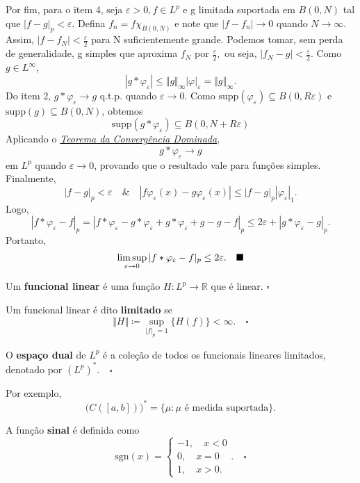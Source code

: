 \documentclass[MeasureTheory/measure_theory.tex]{subfiles}
\begin{document}
\begin{proof*}
	Por fim, para o item 4, seja \(\varepsilon > 0, f\in L^{p}\) e g limitada suportada em \(B(0, N)\) tal que \(|f-g|_{p}< \varepsilon .\) Defina \(f_{n} = f\chi_{B(0, N)}\) e note que \(|f-f_{n}|\to 0\) quando \(N\to \infty\). Assim,
	\(|f-f_{N}|<\frac{\varepsilon }{2}\) para N suficientemente grande. Podemos tomar, sem perda de generalidade, g simples que aproxima \(f_{N}\) por \(\frac{\varepsilon }{2},\) ou seja, \(|f_{N}-g|<\frac{\varepsilon }{2}\). Como \(g\in L^{\infty}\),
	\[
		|g*\varphi_{\varepsilon }|\leq \Vert g \Vert_{\infty}|\varphi |_{\varepsilon } = \Vert g \Vert_{\infty}.
	\]
	Do item 2, \(g*\varphi_{\varepsilon }\to g\) q.t.p. quando \(\varepsilon \to 0\). Como \(\mathrm{supp}(\varphi_{\varepsilon })\subseteq B(0, R\varepsilon )\) e \(\mathrm{supp}(g)\subseteq B(0, N)\), obtemos
	\[
		\mathrm{supp}(g*\varphi_{\varepsilon })\subseteq B(0, N + R\varepsilon )
	\]
	Aplicando o \hyperlink{dominated_convergence}{\textit{Teorema da Convergência Dominada}},
	\[
		g*\varphi_{\varepsilon }\to g
	\]
	em \(L^{p}\) quando \(\varepsilon \to 0\), provando que o resultado vale para funções simples. Finalmente,
	\[
		|f-g|_{p} <\varepsilon \quad\&\quad |f \varphi_{\varepsilon }(x) - g \varphi_{\varepsilon }(x)| \leq |f-g|_{p}|\varphi_{\varepsilon }|_{1}.
	\]
	Logo,
	\[
		|f*\varphi_{\varepsilon } - f|_{p} = |f*\varphi_{\varepsilon } - g*\varphi_{\varepsilon } + g*\varphi_{\varepsilon } + g - g - f|_{p}\leq 2\varepsilon + |g*\varphi_{\varepsilon }-g|_{p}.
	\]
	Portanto,
	\[
		\limsup_{\varepsilon \to 0}|f*\varphi_{\varepsilon }-f|_p \leq 2\varepsilon.\quad \text{$\blacksquare$}
	\]
\end{proof*}
\begin{def*}
	Um \textbf{funcional linear} é uma função \(H:L^{p}\rightarrow \mathbb{R}\) que é linear. \(\square\)
\end{def*}
\begin{def*}
	Um funcional linear é dito \textbf{limitado} se
	\[
		\Vert H \Vert\coloneqq \sup_{|f|_{p}=1}\{H(f)\} < \infty.\quad \square
	\]
\end{def*}
\begin{def*}
	O \textbf{espaço dual} de \(L^{p}\) é a coleção de todos os funcionais lineares limitados, denotado por \((L^{p})^{*}.\quad \square\)
\end{def*}
\begin{example}
	Por exemplo,
	\[
		\biggl(C([a, b])\biggr)^{*} = \{\mu : \mu \text{ é medida suportada}\}.
	\]
\end{example}
\begin{def*}
	A função \textbf{sinal} é definida como
	\[
		\mathrm{sgn}(x)  = \left\{\begin{array}{ll}
			-1,\quad x < 0 \\
			0,\quad x = 0  \\
			1,\quad x > 0.
		\end{array}\right..\quad \square
	\]
\end{def*}
\end{document}
